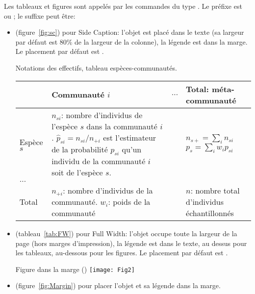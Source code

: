\documentclass[
  a4paper, %
  11pt, extrafontsizes, %
  onecolumn, %
  openright, %
]{memoir}
\begin{document}
Les tableaux et figures sont appelés par les commandes du type . Le préfixe est  ou ; le suffixe peut être:
\begin{itemize}
  \item {} (figure~\ref{fig:sc}) pour \foreignlanguage{english}{Side Caption}: l'objet est placé dans le texte (sa largeur par défaut est 80\% de la largeur de la colonne), la légende est dans la marge. Le placement par défaut est \code{[htbp]}.

{Notations des effectifs, tableau espèces-communautés.}
{
\begin{tabularx}{\textwidth}{p{2cm} p{7cm} p{1cm} X}
\toprule
 & Communauté $i$ & $\dots$ & Total: méta-communauté \\

\midrule
Espèce $s$ 
   & $n_{si}$: nombre d'individus de l'espèce $s$ dans la communauté $i$. \newline
  $\hat{p}_{si}=n_{si}/n_{+i}$ est l'estimateur de la probabilité $p_{si}$ qu'un individu de la communauté $i$ soit de l'espèce $s$.
  &
  & $n_{s+}=\sum_i{n_{si}}$ \newline
    $p_s=\sum_i{w_{i}p_{si}}$ \\

$\dots$
  &
  &
  & \\

Total
  & $n_{+i}$: nombre d'individus de la communauté.\newline 
    $w_i$: poids de la communauté
  &
  & $n$: nombre total d'individus échantillonnés \\

\bottomrule
\end{tabularx}
}

  \item {} (tableau~\ref{tab:FW}) pour \foreignlanguage{english}{Full Width}: l'objet occupe toute la largeur de la page (hors marges d'impression), la légende est dans le texte, au dessus pour les tableaux, au-dessous pour les figures. Le placement par défaut est \code{[tbp]}.

  {Figure dans la marge ()}
  {\texttt{[image: Fig2]}}

  \item  {} (figure~\ref{fig:Margin}) pour placer l'objet et sa légende dans la marge.
\end{itemize}
\end{document}
